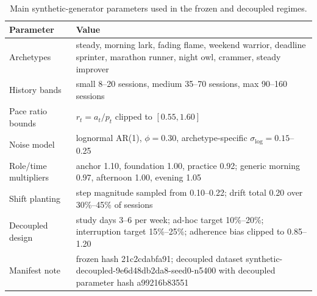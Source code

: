 \documentclass[conference]{IEEEtran}
\begin{document}
\begin{table}[!t]
\centering
\caption{Main synthetic-generator parameters used in the frozen and decoupled regimes.}
\label{tab:generator-params}
\scriptsize
\begin{tabular}{p{2.55cm} p{4.45cm}}
\toprule
\textbf{Parameter} & \textbf{Value} \\
\midrule
Archetypes & steady, morning lark, fading flame, weekend warrior, deadline sprinter, marathon runner, night owl, crammer, steady improver \\
History bands & small 8--20 sessions, medium 35--70 sessions, max 90--160 sessions \\
Pace ratio bounds & $r_t = a_t/p_t$ clipped to $[0.55,1.60]$ \\
Noise model & lognormal AR(1), $\phi=0.30$, archetype-specific $\sigma_{\log}=0.15$--0.25 \\
Role/time multipliers & anchor 1.10, foundation 1.00, practice 0.92; generic morning 0.97, afternoon 1.00, evening 1.05 \\
Shift planting & step magnitude sampled from 0.10--0.22; drift total 0.20 over 30\%--45\% of sessions \\
Decoupled design & study days 3--6 per week; ad-hoc target 10\%--20\%; interruption target 15\%--25\%; adherence bias clipped to 0.85--1.20 \\
Manifest note & frozen hash 21c2cdabfa91; decoupled dataset synthetic-decoupled-9e6d48db2da8-seed0-n5400 with decoupled parameter hash a99216b83551 \\
\bottomrule
\end{tabular}
\end{table}
\end{document}
